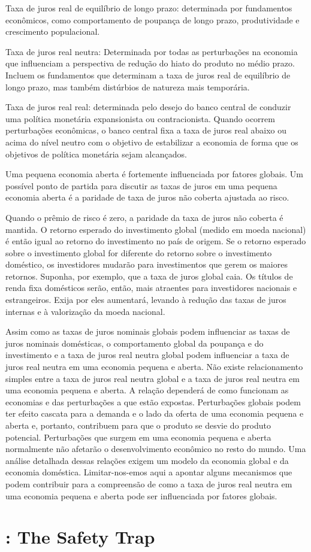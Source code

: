 Taxa de juros real de equilíbrio de longo prazo: determinada por fundamentos econômicos, como comportamento de poupança de longo prazo, produtividade e crescimento populacional.

Taxa de juros real neutra: Determinada por todas as perturbações na economia que influenciam a perspectiva de redução do hiato do produto no médio prazo. Incluem os fundamentos que determinam a taxa de juros real de equilíbrio de longo prazo, mas também distúrbios de natureza mais temporária.

Taxa de juros real real: determinada pelo desejo do banco central de conduzir uma política monetária expansionista ou contracionista. Quando ocorrem perturbações econômicas, o banco central fixa a taxa de juros real abaixo ou acima do nível neutro com o objetivo de estabilizar a economia de forma que os objetivos de política monetária sejam alcançados.

Uma pequena economia aberta é fortemente influenciada por fatores globais. Um possível ponto de partida para discutir as taxas de juros em uma pequena economia aberta é a paridade de taxa de juros não coberta ajustada ao risco.

Quando o prêmio de risco é zero, a paridade da taxa de juros não coberta é mantida. O retorno esperado do investimento global (medido em moeda nacional) é então igual ao retorno do investimento no país de origem. Se o retorno esperado sobre o investimento global for diferente do retorno sobre o investimento doméstico, os investidores mudarão para investimentos que gerem os maiores retornos. Suponha, por exemplo, que a taxa de juros global caia. Os títulos de renda fixa domésticos serão, então, mais atraentes para investidores nacionais e estrangeiros. Exija por eles aumentará, levando à redução das taxas de juros internas e à valorização da moeda nacional.

Assim como as taxas de juros nominais globais podem influenciar as taxas de juros nominais domésticas, o comportamento global da poupança e do investimento e a taxa de juros real neutra global podem influenciar a taxa de juros real neutra em uma economia pequena e aberta. Não existe relacionamento simples
entre a taxa de juros real neutra global e a taxa de juros real neutra em uma economia pequena e aberta. A relação dependerá de como funcionam as economias e das perturbações a que estão expostas. Perturbações globais podem ter efeito cascata para a demanda e o lado da oferta de uma economia pequena e aberta e, portanto, contribuem para que o produto se desvie do produto potencial. Perturbações que surgem em uma economia pequena e aberta normalmente não afetarão o desenvolvimento econômico no resto do mundo. Uma análise detalhada dessas relações exigem um modelo da economia global e da economia doméstica. Limitar-nos-emos aqui a apontar alguns mecanismos que podem contribuir para a compreensão de como a taxa de juros real neutra em uma economia pequena e aberta pode ser influenciada por fatores globais.
%
%
\section{\citet{Caballero:2017}: The Safety Trap}